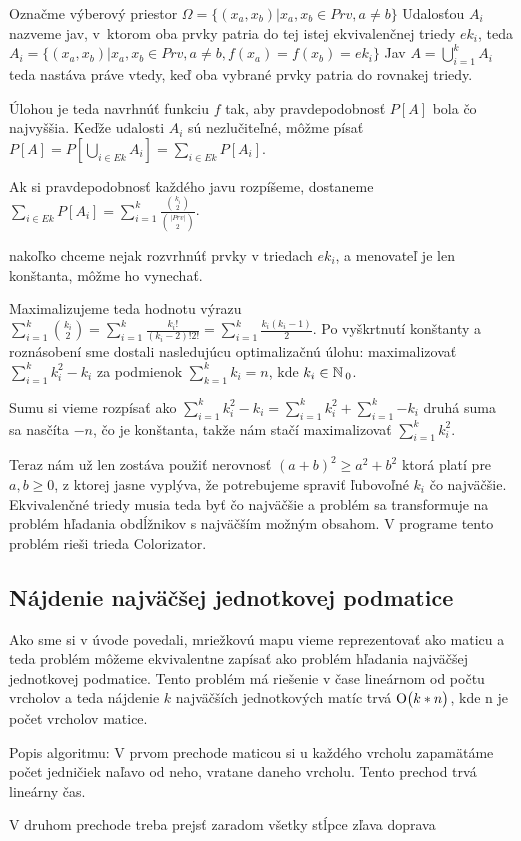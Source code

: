 Označme výberový priestor $\Omega = \{(x_a, x_b) | x_a, x_b \in Prv, a \not= b \}$
Udalosťou $A_i$ nazveme jav, v~ktorom oba prvky patria do tej istej ekvivalenčnej triedy $ek_i$,
teda $A_i = \{(x_a, x_b) | x_a, x_b \in Prv, a \not= b, f(x_a) = f(x_b) = ek_i \}$
Jav $A = \bigcup_{i=1}^{k} A_i$ teda nastáva práve vtedy,
 keď oba vybrané prvky patria do rovnakej triedy.

Úlohou je teda navrhnúť funkciu $f$ tak, aby pravdepodobnosť $P[A]$ bola čo najvyššia. 
Keďže udalosti $A_i$ sú nezlučiteľné, môžme písať 
$P[A] = P[\bigcup_{i \in Ek} A_i] = \sum_{i \in Ek}P[A_i]$.

Ak si pravdepodobnosť každého javu rozpíšeme, dostaneme 
$\sum_{i \in Ek}P[A_i] = \sum_{i = 1}^{k} \frac{{{k_i} \choose {2}}}{{{|Prv|} \choose {2}}}$.


nakoľko chceme nejak rozvrhnúť prvky v triedach $ek_i$, a menovateľ je len
konštanta, môžme ho vynechať.

Maximalizujeme teda hodnotu výrazu 
$\sum_{i = 1}^{k} {{k_i} \choose {2}} = \sum_{i = 1}^{k} {\frac{k_i!}{(k_i -2 )!2!}} = \sum_{i = 1}^{k}{\frac{k_i (k_i-1)}{2}}$.
Po vyškrtnutí konštanty a roznásobení sme dostali nasledujúcu optimalizačnú úlohu:
maximalizovať $\sum_{i = 1}^{k} {k_i^2 - k_i}$ za podmienok $\sum_{k=1}^{k}k_i = n$,
kde $k_i \in \mathbb{N}\,_0$.

Sumu si vieme rozpísať ako 
$\sum_{i = 1}^{k} {k_i^2 - k_i} = \sum_{i = 1}^{k} {k_i^2} + \sum_{i = 1}^{k}{-k_i}$
druhá suma sa nasčíta $-n$, čo je konštanta, takže nám stačí maximalizovať 
$\sum_{i = 1}^{k} {k_i^2}$.

Teraz nám už len zostáva použiť nerovnosť
$(a+b)^2 \geq a^2 + b^2$ ktorá platí pre $a,b \geq 0$, z ktorej jasne vyplýva, že potrebujeme spraviť ľubovoľné $k_i$ čo najväčšie.
Ekvivalenčné triedy musia teda byť čo najväčšie a problém sa transformuje na problém hľadania
obdĺžnikov s najväčším možným obsahom.
V programe tento problém rieši trieda Colorizator.


\subsection{Nájdenie najväčšej jednotkovej podmatice}
Ako sme si v úvode povedali, mriežkovú mapu vieme reprezentovať ako maticu a teda
problém môžeme ekvivalentne zapísať ako problém hľadania najväčšej jednotkovej podmatice.
Tento problém má riešenie v čase lineárnom od počtu vrcholov a teda nájdenie $k$ najväčších
jednotkových matíc trvá $\operatorname{O}\bigl(k*n\bigr)$, kde n je počet vrcholov matice.

Popis algoritmu: 
V prvom prechode maticou si u každého vrcholu zapamätáme počet jedničiek naľavo od neho, vratane daneho vrcholu. 
Tento prechod trvá lineárny čas.

V druhom prechode treba prejsť zaradom všetky stĺpce zľava doprava